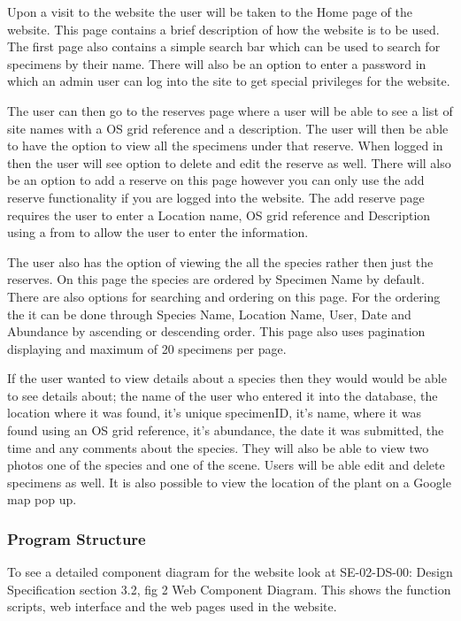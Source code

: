         Upon a visit to the website the user will be taken to the Home page of the website. This page contains a brief description of how the website is to be used. The first page also contains a simple search bar which can be used to search for specimens by their name. There will also be an option to enter a password in which an admin user can log into the site to get special privileges for the website.

        The user can then go to the reserves page where a  user will be able to see a list of site names with a OS grid reference and a description. The user will then be able to have the option to view all the specimens under that reserve. When logged in then the user will see option to delete and edit the reserve as well. There will also be an option to add a reserve on this page however you can only use the add reserve functionality if you are logged into the website. The add reserve page requires the user to enter a Location name, OS grid reference and Description using a from to allow the user to enter the information.
    
        The user also has the option of viewing the all the species rather then just the reserves. On this page the species are ordered by Specimen Name by default. There are also options for searching and ordering on this page. For the ordering the it can be done through Species Name, Location Name, User, Date and Abundance by ascending or descending order. This page also uses pagination displaying and maximum of 20 specimens per page.
        
        If the user wanted to view details about a species then they would would be able to see details about; the name of the user who entered it into the database, the location where it was found,  it's unique specimenID, it's name, where it was found using an OS grid reference, it's abundance, the date it was submitted, the time and any comments about the species. They will also be able to view two photos one of the species and one of the scene. Users will be able edit and delete specimens as well. It is also possible to view the location of the plant on a Google map pop up.    

    \subsubsection{Program Structure}

        To see a detailed component diagram for the website look at SE-02-DS-00: Design Specification section 3.2, fig 2 Web Component Diagram. This shows the function scripts, web interface and the web pages used in the website.

